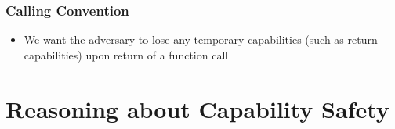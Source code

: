 \documentclass{beamer}
\begin{document}
\begin{frame}
\frametitle{Calling Convention}
%
\begin{itemize}
	\item We want the adversary to lose any temporary capabilities (such as return capabilities) upon return of a function call
\end{itemize}
\end{frame}

\section{Reasoning about Capability Safety}
\end{document}
